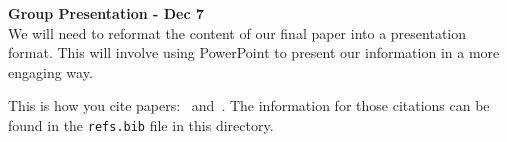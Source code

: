 \documentclass[12pt]{article}
\begin{document}
\noindent
\textbf{Group Presentation - Dec 7} \\
We will need to reformat the content of our final paper into a presentation
format. This will involve using PowerPoint to present our information in
a more engaging way.


This is how you cite papers:~\cite{Othman13:Gates} and~\cite{Pennock01:Real}.  The information for those citations can be found in the \texttt{refs.bib} file in this directory.



\end{document}
